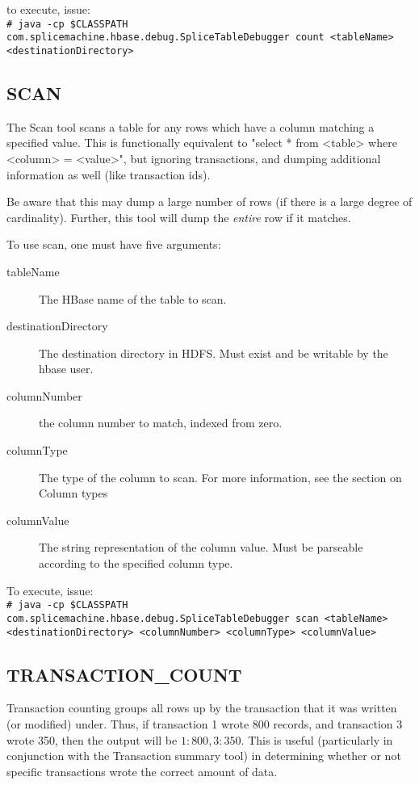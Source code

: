 \documentclass[10pt]{article}
\newcommand{\shellcmd}[1]{\\\indent\indent\texttt{\footnotesize\# #1}\\}
\begin{document}
to execute, issue:
\shellcmd{java -cp \$CLASSPATH com.splicemachine.hbase.debug.SpliceTableDebugger count <tableName> <destinationDirectory>}

\subsection{SCAN}
The Scan tool scans a table for any rows which have a column matching a specified value. This is functionally equivalent to "select * from <table> where <column> = <value>", but ignoring transactions, and dumping additional information as well (like transaction ids).

Be aware that this may dump a large number of rows (if there is a large degree of cardinality). Further, this tool will dump the \emph{entire} row if it matches. 

To use scan, one must have five arguments:

\begin{description}
\item[tableName] The HBase name of the table to scan.
\item[destinationDirectory] The destination directory in HDFS. Must exist and be writable by the hbase user.
\item[columnNumber] the column number to match, indexed from zero.
\item[columnType] The type of the column to scan. For more information, see the section on Column types
\item[columnValue] The string representation of the column value. Must be parseable according to the specified column type.
\end{description}

To execute, issue:
\shellcmd{java -cp \$CLASSPATH com.splicemachine.hbase.debug.SpliceTableDebugger scan <tableName> <destinationDirectory> <columnNumber> <columnType> <columnValue>}

\subsection{TRANSACTION\_COUNT}
Transaction counting groups all rows up by the transaction that it was written (or modified) under. Thus, if transaction 1 wrote 800 records, and transaction 3 wrote 350, then the output will be $1:800, 3:350$. This is useful (particularly in conjunction with the Transaction summary tool) in determining whether or not specific 
transactions wrote the correct amount of data.
\end{document}
